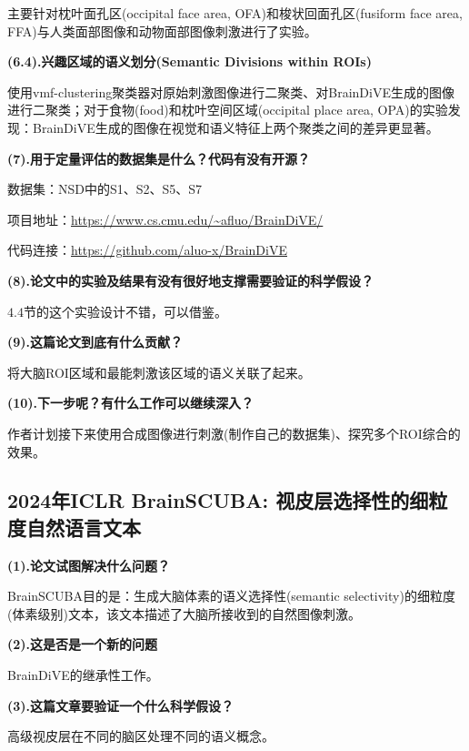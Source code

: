 \documentclass[12pt, a4paper, oneside]{ctexart}
\begin{document}
    主要针对枕叶面孔区(occipital face area, OFA)和梭状回面孔区(fusiform face area, FFA)与人类面部图像和动物面部图像刺激进行了实验。

    \noindent\textbf{(6.4).兴趣区域的语义划分(Semantic Divisions within ROIs)}

    使用vmf-clustering\cite{10.5555/1046920.1088718}聚类器对原始刺激图像进行二聚类、对BrainDiVE生成的图像进行二聚类；对于食物(food)和枕叶空间区域(occipital place area, OPA)的实验发现：BrainDiVE生成的图像在视觉和语义特征上两个聚类之间的差异更显著。

    \noindent\textbf{(7).用于定量评估的数据集是什么？代码有没有开源？}

    数据集：NSD\cite{Allen2022}中的S1、S2、S5、S7

    项目地址：\url{https://www.cs.cmu.edu/~afluo/BrainDiVE/}

    代码连接：\url{https://github.com/aluo-x/BrainDiVE}

    \noindent\textbf{(8).论文中的实验及结果有没有很好地支撑需要验证的科学假设？}

    $4.4$节的这个实验设计不错，可以借鉴。

    \noindent\textbf{(9).这篇论文到底有什么贡献？}

    将大脑ROI区域和最能刺激该区域的语义关联了起来。

    \noindent\textbf{(10).下一步呢？有什么工作可以继续深入？}

    作者计划接下来使用合成图像进行刺激(制作自己的数据集)、探究多个ROI综合的效果。

    \subsection{2024年ICLR BrainSCUBA: 视皮层选择性的细粒度自然语言文本\cite{luo2023brainscuba}}

    \noindent\textbf{(1).论文试图解决什么问题？}

    BrainSCUBA目的是：生成大脑体素的语义选择性(semantic selectivity)的细粒度(体素级别)文本，该文本描述了大脑所接收到的自然图像刺激。

    \noindent\textbf{(2).这是否是一个新的问题}

    BrainDiVE\cite{luo2023brain}的继承性工作。

    \noindent\textbf{(3).这篇文章要验证一个什么科学假设？}

    高级视皮层在不同的脑区处理不同的语义概念。
\end{document}
